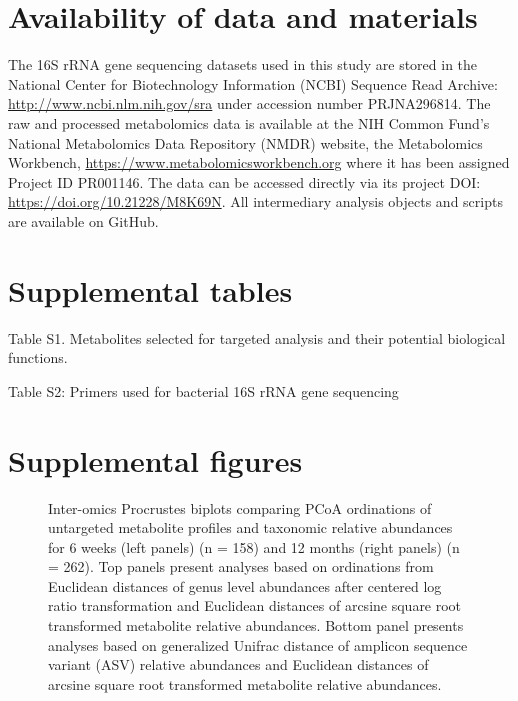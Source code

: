 \section{Availability of data and materials}

The 16S rRNA gene sequencing datasets used in this study are stored in the National Center for Biotechnology Information (NCBI) Sequence Read Archive: \url{http://www.ncbi.nlm.nih.gov/sra} under accession number PRJNA296814. The raw and processed metabolomics data is available at the NIH Common Fund's National Metabolomics Data Repository (NMDR) website, the Metabolomics Workbench, \url{https://www.metabolomicsworkbench.org} where it has been assigned Project ID PR001146. The data can be accessed directly via its project DOI: \url{https://doi.org/10.21228/M8K69N}. All intermediary analysis objects and scripts are available on GitHub. 

\section{Supplemental tables}

Table S1. Metabolites selected for targeted analysis and their potential biological functions.

Table S2: Primers used for bacterial 16S rRNA gene sequencing 

\section{Supplemental figures}

\begin{figure}
    \centering
    \caption[Inter-omics Procrustes biplots comparing PCoA ordinations of untargeted metabolite profiles and taxonomic relative abundances for 6 weeks (left panels) (n = 158) and 12 months (right panels) (n = 262).]{Inter-omics Procrustes biplots comparing PCoA ordinations of untargeted metabolite profiles and taxonomic relative abundances for 6 weeks (left panels) (n = 158) and 12 months (right panels) (n = 262). Top panels present analyses based on ordinations from Euclidean distances of genus level abundances after centered log ratio transformation and Euclidean distances of arcsine square root transformed metabolite relative abundances. Bottom panel presents analyses based on generalized Unifrac distance of amplicon sequence variant (ASV) relative abundances and Euclidean distances of arcsine square root transformed metabolite relative abundances.}
    \label{fig:b1}
\end{figure}

